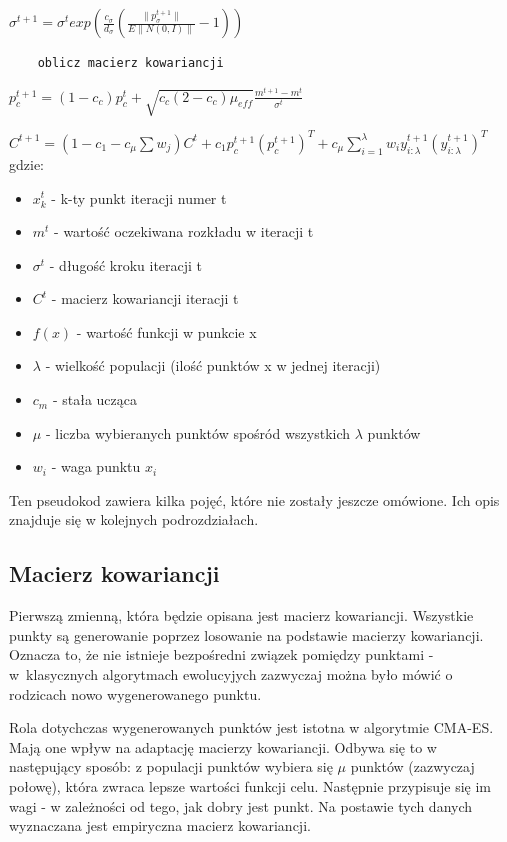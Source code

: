 \documentclass{mini}
\newcommand{\CMAES}{\mbox{CMA-ES}}
\begin{document}
\hspace{8,5ex} $\sigma^{t+1}=\sigma^t exp (\frac{c_\sigma}{d_\sigma}(\frac{\|p_\sigma^{t+1}\|}{E\|N(0,I)\|}-1))$
\begin{Verbatim}
	oblicz macierz kowariancji
\end{Verbatim}
\hspace{12ex} $p_c^{t+1} = (1-c_c)p_c^t+\sqrt{c_c(2-c_c)\mu_{eff}}\frac{m^{t+1}-m^t}{\sigma^t}$

\hspace{8,5ex} $C^{t+1} = (1-c_1-c_\mu\sum{w_j})C^t+c_1p_c^{t+1}{(p_c^{t+1})}^T+c_\mu \sum\limits_{i=1}^\lambda w_iy_{i:\lambda}^{t+1}{(y_{i:\lambda}^{t+1})}^T$
\newline
gdzie:
\begin{itemize}[noitemsep]
\item $x_k^t$ - k-ty punkt iteracji numer t
\item $m^t$ - wartość oczekiwana rozkładu w iteracji t
\item $\sigma^t$ - długość kroku iteracji t
\item $C^t$ - macierz kowariancji iteracji t
\item $f(x)$ - wartość funkcji w punkcie x
\item $\lambda$ - wielkość populacji (ilość punktów x w jednej iteracji)
\item $c_m$ - stała ucząca
\item $\mu$ - liczba wybieranych punktów spośród wszystkich $\lambda$ punktów
\item $w_i$ - waga punktu $x_i$
\end{itemize}

Ten pseudokod zawiera kilka pojęć, które nie zostały jeszcze omówione. Ich opis znajduje się w kolejnych podrozdziałach.

\subsection{Macierz kowariancji}
Pierwszą zmienną, która będzie opisana jest macierz kowariancji. Wszystkie punkty są generowanie poprzez losowanie na podstawie macierzy kowariancji. Oznacza to, że nie istnieje bezpośredni związek pomiędzy punktami - w~klasycznych algorytmach ewolucyjych zazwyczaj można było mówić o rodzicach nowo wygenerowanego punktu.

Rola dotychczas wygenerowanych punktów jest istotna w algorytmie \CMAES. Mają one wpływ na adaptację macierzy kowariancji. Odbywa się to w następujący sposób: z populacji punktów wybiera się $\mu$ punktów (zazwyczaj połowę), która zwraca lepsze wartości funkcji celu. Następnie przypisuje się im wagi - w zależności od tego, jak dobry jest punkt. Na postawie tych danych wyznaczana jest empiryczna macierz kowariancji.
\end{document}
